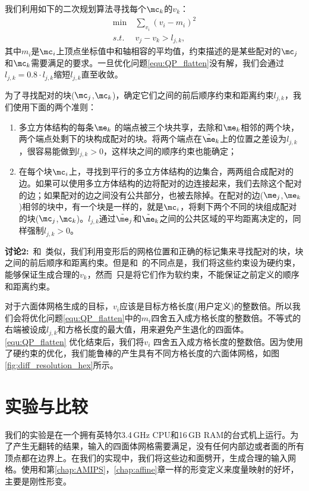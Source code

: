 我们利用如下的二次规划算法寻找每个$\mc_k$的$v_k$：
\begin{equation} \label{equ:QP_flatten}
\begin{split}
    \min \   &\sum_{v_i} (v_i - m_i)^2 \\
      s.t. \ &v_j - v_k > l_{j,k},
\end{split}
\end{equation}
其中$m_i$是$\mc_i$上顶点坐标值中和轴相容的平均值，约束描述的是某些配对的$\mc_j$和$\mc_k$需要满足的要求。一旦优化问题\ref{equ:QP_flatten}没有解，我们会通过$l_{j,k} = 0.8 \cdot l_{j,k}$缩短$l_{j,k}$直至收敛。

为了寻找配对的块($\mc_j$,$\mc_k$)，确定它们之间的前后顺序约束和距离约束$l_{j,k}$，我们使用下面的两个准则：
\begin{enumerate}
\item 多立方体结构的每条$\me_k$ 的端点被三个块共享，去除和$\me_k$相邻的两个块，两个端点处剩下的块构成配对的块。将两个端点在$\tilde{\me}_k$上的位置之差设为$l_{j,k}$，很容易能做到$l_{j,k}>0$，这样块之间的顺序约束也能确定；
\item 在每个块$\mc_i$上，寻找到平行的多立方体结构的边集合，两两组合成配对的边。如果可以使用多立方体结构的边将配对的边连接起来，我们去除这个配对的边；如果配对的边之间没有公共部分，也被去除掉。在配对的边($\me_j$,$\me_k$)相邻的块中，有一个块是一样的，就是$\mc_i$，将剩下两个不同的块组成配对的块($\mc_j$,$\mc_k$)。$l_{j,k}$通过$\tilde{\me}_j$和$\tilde{\me}_k$之间的公共区域的平均距离决定的，同样强制$l_{j,k}>0$。
\end{enumerate}
\textbf{讨论2:}\, 和~\cite{Gregson2011}类似，我们利用变形后的网格位置和正确的标记集来寻找配对的块，块之间的前后顺序和距离约束。但是和~\cite{Gregson2011}的不同点是，我们将这些约束设为硬约束，能够保证生成合理的$v_k$，然而~\cite{Gregson2011}只是将它们作为软约束，不能保证之前定义的顺序和距离约束。

对于六面体网格生成的目标，$v_i$应该是目标方格长度(用户定义)的整数倍。所以我们会将优化问题\ref{equ:QP_flatten}中的$m_i$四舍五入成方格长度的整数倍。不等式的右端被设成$l_{j,k}$和方格长度的最大值，用来避免产生退化的四面体。\ref{equ:QP_flatten} 优化结束后，我们将$v_i$ 四舍五入成方格长度的整数倍。因为使用了硬约束的优化，我们能鲁棒的产生具有不同方格长度的六面体网格，如图\ref{fig:diff_resolution_hex}所示。

\section{实验与比较} \label{sec:pc_results}
我们的实验是在一个拥有英特尔3.4\,GHz CPU和16\,GB RAM的台式机上运行。为了产生无翻转的结果，输入的四面体网格需要满足，没有任何内部边或者面的所有顶点都在边界上\cite{Aigerman2013}。在我们的实现中，我们将这些边和面劈开，生成合理的输入网格。使用和第\ref{chap:AMIPS}，\ref{chap:affine}章一样的形变定义来度量映射的好坏，主要是刚性形变。

